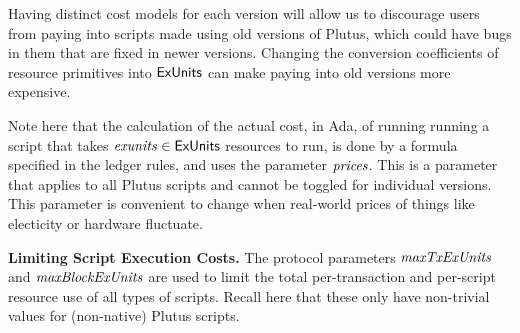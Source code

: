Having distinct cost models for each version will allow us to discourage users from
paying into scripts made using old versions of Plutus, which could have bugs
in them that are fixed in newer versions. Changing the conversion coefficients
of resource primitives into $\mathsf{ExUnits}$ can make paying into old versions
more expensive.

Note here that the calculation of the actual cost, in Ada, of running
running a script that takes $\mathit{exunits} \in \mathsf{ExUnits}$ resources to run,
is done by a formula specified in the ledger rules, and uses the parameter
$\mathit{prices}$. This is a parameter that applies to all Plutus
scripts and cannot be toggled for individual versions. This parameter is
convenient to change when real-world prices of things like electicity or hardware
fluctuate.

\textbf{Limiting Script Execution Costs.}
The protocol parameters $\mathit{maxTxExUnits}$ and $\mathit{maxBlockExUnits}$ are
used to limit the total per-transaction and per-script resource use of all
types of scripts. Recall here that these only have non-trivial values for
(non-native) Plutus scripts.

